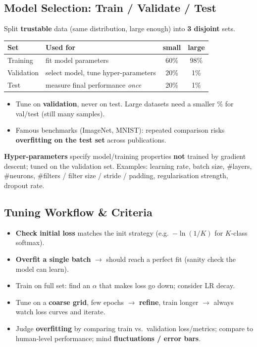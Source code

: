 \documentclass[10pt,a4paper]{article}
\begin{document}
	\subsection{Model Selection: Train / Validate / Test}

	\begin{definitionbox}
		Split \textbf{trustable} data (same distribution, large enough) into \textbf{3 disjoint} sets.
	\end{definitionbox}

	\begin{center}
	\begin{tabular}{@{}llcc@{}}
		\toprule
		\textbf{Set} & \textbf{Used for} & \textbf{small} & \textbf{large} \\
		\midrule
		Training   & fit model parameters                 & 60\% & 98\% \\
		Validation & select model, tune hyper-parameters  & 20\% & 1\%  \\
		Test       & measure final performance \emph{once}& 20\% & 1\%  \\
		\bottomrule
	\end{tabular}
	\end{center}
	\begin{itemize}[leftmargin=*]
		\item Tune on \textbf{validation}, never on test. Large datasets need a smaller \% for val/test (still many samples).
		\item Famous benchmarks (ImageNet, MNIST): repeated comparison risks \textbf{overfitting on the test set} across publications.
	\end{itemize}

	\begin{definitionbox}
		\textbf{Hyper-parameters} specify model/training properties \textbf{not} trained by gradient descent; tuned on the validation set. Examples: learning rate, batch size, \#layers, \#neurons, \#filters / filter size / stride / padding, regularisation strength, dropout rate.
	\end{definitionbox}

	\subsection{Tuning Workflow \& Criteria}

	\begin{itemize}[leftmargin=*]
		\item \textbf{Check initial loss} matches the init strategy (e.g.\ $-\ln(1/K)$ for $K$-class softmax).
		\item \textbf{Overfit a single batch} $\rightarrow$ should reach a perfect fit (sanity check the model can learn).
		\item Train on full set: find an $\alpha$ that makes loss go down; consider LR decay.
		\item Tune on a \textbf{coarse grid}, few epochs $\rightarrow$ \textbf{refine}, train longer $\rightarrow$ always watch loss curves and iterate.
		\item Judge \textbf{overfitting} by comparing train vs.\ validation loss/metrics; compare to human-level performance; mind \textbf{fluctuations / error bars}.
	\end{itemize}
\end{document}

